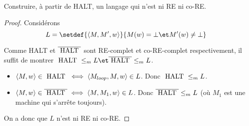 \begin{exercice}
	Construire, à partir de HALT, un langage qui n'est ni RE ni co-RE.
\end{exercice}

\begin{proof}
	Considérons
	$$ L = \setdef {\encode {M,M',w}} {M(w) = \bot \et M'(w) \neq \bot} $$

	Comme HALT et $\overline {\text{ HALT }}$ sont RE-complet et co-RE-complet respectivement, il suffit de montrer $\halt \leqm L \et \overline{\halt} \leqm L$.

	\begin{itemize}
		\item $\left\langle M,w\right\rangle \in \text{ HALT } \iff \left\langle M_{loop}, M, w\right\rangle \in L$. Donc $\text{ HALT } \leq_m L$.
		\item $\left\langle M,w\right\rangle \in \overline{\text{ HALT }} \iff \left\langle M, M_1, w\right\rangle \in L$. Donc $\overline{\text{ HALT }} \leq_m L$ (où $M_1$ est une machine qui s'arrête toujours).
	\end{itemize}

	On a donc que $L$ n'est ni RE ni co-RE.
\end{proof}


